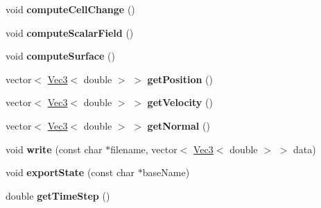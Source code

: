 \begin{DoxyCompactItemize}
\item 
\hypertarget{classhokusai_1_1System_afc3b5fcd99f7833cbcdff9bffc01aead}{void {\bfseries compute\+Cell\+Change} ()}\label{classhokusai_1_1System_afc3b5fcd99f7833cbcdff9bffc01aead}

\item 
\hypertarget{classhokusai_1_1System_abe02eb4186b7435da62ae8a1faf34729}{void {\bfseries compute\+Scalar\+Field} ()}\label{classhokusai_1_1System_abe02eb4186b7435da62ae8a1faf34729}

\item 
\hypertarget{classhokusai_1_1System_acb64e47f72964c8c3c93e1cf8056d8a0}{void {\bfseries compute\+Surface} ()}\label{classhokusai_1_1System_acb64e47f72964c8c3c93e1cf8056d8a0}

\item 
\hypertarget{classhokusai_1_1System_a9b8590d75098c5aa4b11287c692eeaf9}{vector$<$ \hyperlink{classhokusai_1_1Vec3}{Vec3}$<$ double $>$ $>$ {\bfseries get\+Position} ()}\label{classhokusai_1_1System_a9b8590d75098c5aa4b11287c692eeaf9}

\item 
\hypertarget{classhokusai_1_1System_ab0b1c9d22844dc40635fe89bcae82f36}{vector$<$ \hyperlink{classhokusai_1_1Vec3}{Vec3}$<$ double $>$ $>$ {\bfseries get\+Velocity} ()}\label{classhokusai_1_1System_ab0b1c9d22844dc40635fe89bcae82f36}

\item 
\hypertarget{classhokusai_1_1System_a3ac3dfd10317d3e371b8e3dfa59c0fdd}{vector$<$ \hyperlink{classhokusai_1_1Vec3}{Vec3}$<$ double $>$ $>$ {\bfseries get\+Normal} ()}\label{classhokusai_1_1System_a3ac3dfd10317d3e371b8e3dfa59c0fdd}

\item 
\hypertarget{classhokusai_1_1System_ae2b2f8df92f89f760a32c2366f110f95}{void {\bfseries write} (const char $\ast$filename, vector$<$ \hyperlink{classhokusai_1_1Vec3}{Vec3}$<$ double $>$ $>$ data)}\label{classhokusai_1_1System_ae2b2f8df92f89f760a32c2366f110f95}

\item 
\hypertarget{classhokusai_1_1System_a829bce7b9916f4e566b42dacfd3c90ab}{void {\bfseries export\+State} (const char $\ast$base\+Name)}\label{classhokusai_1_1System_a829bce7b9916f4e566b42dacfd3c90ab}

\item 
\hypertarget{classhokusai_1_1System_ac9b5c1427e26ac91bfadefb9d50a7828}{double {\bfseries get\+Time\+Step} ()}\label{classhokusai_1_1System_ac9b5c1427e26ac91bfadefb9d50a7828}


\end{DoxyCompactItemize}
